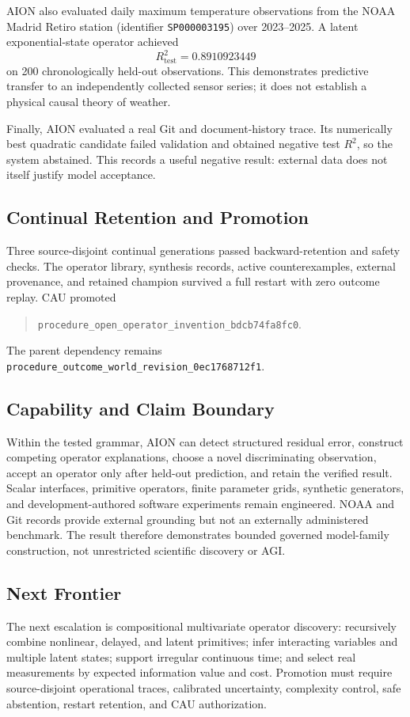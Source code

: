 AION also evaluated daily maximum temperature observations from the NOAA
Madrid Retiro station (identifier \texttt{SP000003195}) over 2023--2025. A
latent exponential-state operator achieved
\[
R^2_{\mathrm{test}}=0.8910923449
\]
on 200 chronologically held-out observations. This demonstrates predictive
transfer to an independently collected sensor series; it does not establish a
physical causal theory of weather.

Finally, AION evaluated a real Git and document-history trace. Its numerically
best quadratic candidate failed validation and obtained negative test
\(R^2\), so the system abstained. This records a useful negative result:
external data does not itself justify model acceptance.

\subsection{Continual Retention and Promotion}

Three source-disjoint continual generations passed backward-retention and
safety checks. The operator library, synthesis records, active
counterexamples, external provenance, and retained champion survived a full
restart with zero outcome replay. CAU promoted
\begin{quote}
\texttt{procedure\_open\_operator\_invention\_bdcb74fa8fc0}.
\end{quote}
The parent dependency remains
\texttt{procedure\_outcome\_world\_revision\_0ec1768712f1}.

\subsection{Capability and Claim Boundary}

Within the tested grammar, AION can detect structured residual error, construct
competing operator explanations, choose a novel discriminating observation,
accept an operator only after held-out prediction, and retain the verified
result. Scalar interfaces, primitive operators, finite parameter grids,
synthetic generators, and development-authored software experiments remain
engineered. NOAA and Git records provide external grounding but not an
externally administered benchmark. The result therefore demonstrates bounded
governed model-family construction, not unrestricted scientific discovery or
AGI.

\subsection{Next Frontier}

The next escalation is compositional multivariate operator discovery:
recursively combine nonlinear, delayed, and latent primitives; infer interacting
variables and multiple latent states; support irregular continuous time; and
select real measurements by expected information value and cost. Promotion
must require source-disjoint operational traces, calibrated uncertainty,
complexity control, safe abstention, restart retention, and CAU authorization.
